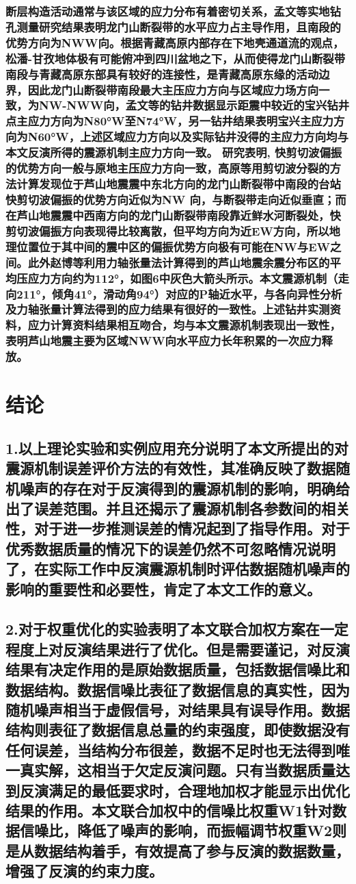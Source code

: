 \documentclass[a4paper,12pt,single,pdftex]{scrartcl}
\begin{document}
\label{ID_1845857375}\subsubsection{断层构造活动通常与该区域的应力分布有着密切关系，孟文等\cite{孟文2013}实地钻孔测量研究结果表明龙门山断裂带的水平应力占主导作用，且南段的优势方向为NWW向。根据青藏高原内部存在下地壳通道流的观点\cite{Royden1997,Clark2000,Meng2005,Burchfiel1995,Harris2007}，松潘-甘孜地体极有可能俯冲到四川盆地之下\cite{楼海2010}，从而使得龙门山断裂带南段与青藏高原东部具有较好的连接性，是青藏高原东缘的活动边界，因此龙门山断裂带南段最大主压应力方向与区域应力场方向一致，为NW-NWW向，孟文等的钻井数据显示距震中较近的宝兴钻井点主应力方向为N80°W至N74°W，另一钻井结果表明宝兴主应力方向为N60°W\cite{秦向辉2013}，上述区域应力方向以及实际钻井没得的主应力方向均与本文反演所得的震源机制主应力方向一致。
研究表明, 快剪切波偏振的优势方向一般与原地主压应力方向一致\cite{高原2008,Gao2011,Gao2012}，高原等\cite{高原2013}用剪切波分裂的方法计算发现位于芦山地震震中东北方向的龙门山断裂带中南段的台站快剪切波偏振的优势方向近似为NW 向，与断裂带走向近似垂直；而在芦山地震震中西南方向的龙门山断裂带南段靠近鲜水河断裂处，快剪切波偏振方向表现得比较离散，但平均方向为近EW方向，所以地理位置位于其中间的震中区的偏振优势方向极有可能在NW与EW之间。此外赵博等\cite{赵博2013}利用力轴张量法计算得到的芦山地震余震分布区的平均压应力方向约为112°，如图6中灰色大箭头所示。本文震源机制（走向211°，倾角41°，滑动角94°）对应的P轴近水平，与各向异性分析及力轴张量计算法得到的应力结果有很好的一致性。上述钻井实测资料，应力计算资料结果相互吻合，均与本文震源机制表现出一致性，表明芦山地震主要为区域NWW向水平应力长年积累的一次应力释放。}

\label{ID_1085563922}\section{结论}

\label{ID_1563432729}\subsection{1.以上理论实验和实例应用充分说明了本文所提出的对震源机制误差评价方法的有效性，其准确反映了数据随机噪声的存在对于反演得到的震源机制的影响，明确给出了误差范围。并且还揭示了震源机制各参数间的相关性，对于进一步推测误差的情况起到了指导作用。对于优秀数据质量的情况下的误差仍然不可忽略情况说明了，在实际工作中反演震源机制时评估数据随机噪声的影响的重要性和必要性，肯定了本文工作的意义。}

\label{ID_257022197}\subsection{2.对于权重优化的实验表明了本文联合加权方案在一定程度上对反演结果进行了优化。但是需要谨记，对反演结果有决定作用的是原始数据质量，包括数据信噪比和数据结构。数据信噪比表征了数据信息的真实性，因为随机噪声相当于虚假信号，对结果具有误导作用。数据结构则表征了数据信息总量的约束强度，即使数据没有任何误差，当结构分布很差，数据不足时也无法得到唯一真实解，这相当于欠定反演问题。只有当数据质量达到反演满足的最低要求时，合理地加权才能显示出优化结果的作用。本文联合加权中的信噪比权重W1针对数据信噪比，降低了噪声的影响，而振幅调节权重W2则是从数据结构着手，有效提高了参与反演的数据数量，增强了反演的约束力度。}
\end{document}

